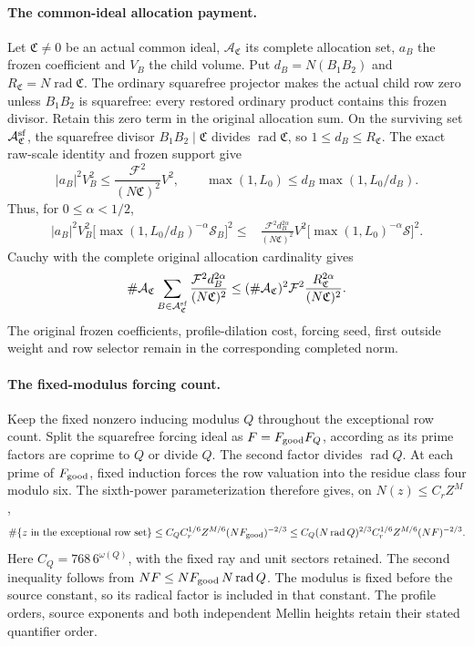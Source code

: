 \paragraph{The common-ideal allocation payment.}
Let \(\mathfrak C\ne0\) be an actual common ideal,
\(\mathcal A_{\mathfrak C}\) its complete allocation set,
\(a_B\) the frozen coefficient and \(V_B\) the child volume.
Put \(d_B=N(B_1B_2)\) and
\(R_{\mathfrak C}=N\operatorname{rad}\mathfrak C\).
The ordinary squarefree projector makes the actual child row zero
unless \(B_1B_2\) is squarefree: every restored ordinary product
contains this frozen divisor. Retain this zero term in the original
allocation sum. On the surviving set \(\mathcal A_{\mathfrak C}^{\rm sf}\),
the squarefree divisor \(B_1B_2\mid\mathfrak C\) divides
\(\operatorname{rad}\mathfrak C\), so \(1\le d_B\le R_{\mathfrak C}\).
The exact raw-scale identity and frozen support give
\[
 |a_B|^2V_B^2\le\frac{\mathcal F^2}{(N\mathfrak C)^2}V^2,
 \qquad \max(1,L_0)\le d_B\max(1,L_0/d_B).
\]
Thus, for \(0\le\alpha<1/2\),
\[
\begin{split}
 |a_B|^2V_B^2
 \bigl[\max(1,L_0/d_B)^{-\alpha}\mathcal S_B\bigr]^2
 \le{}&\frac{\mathcal F^2d_B^{2\alpha}}{(N\mathfrak C)^2}
 V^2\bigl[\max(1,L_0)^{-\alpha}\mathcal S\bigr]^2.
\end{split}
\]
Cauchy with the complete original allocation cardinality gives
\[
 \#\mathcal A_{\mathfrak C}
 \sum_{B\in\mathcal A_{\mathfrak C}^{\rm sf}}
 \frac{\mathcal F^2d_B^{2\alpha}}{(N\mathfrak C)^2}
 \le (\#\mathcal A_{\mathfrak C})^2\mathcal F^2
       \frac{R_{\mathfrak C}^{2\alpha}}{(N\mathfrak C)^2}.
\]
The original frozen coefficients, profile-dilation cost, forcing seed,
first outside weight and row selector remain in the corresponding
completed norm.

\paragraph{The fixed-modulus forcing count.}
Keep the fixed nonzero inducing modulus \(Q\) throughout the exceptional
row count. Split the squarefree forcing ideal as
\(F=F_{\rm good}F_Q\), according as its prime factors are coprime to
\(Q\) or divide \(Q\). The second factor divides
\(\operatorname{rad}Q\). At each prime of \(F_{\rm good}\), fixed
induction forces the row valuation into the residue class four modulo
six. The sixth-power parameterization therefore gives, on
\(N(z)\le C_rZ^M\),
\[
 \#\{z\text{ in the exceptional row set}\}
 \le C_Q C_r^{1/6}Z^{M/6}(NF_{\rm good})^{-2/3}
 \le C_Q(N\operatorname{rad}Q)^{2/3}
       C_r^{1/6}Z^{M/6}(NF)^{-2/3}.
\]
Here \(C_Q=768\,6^{\omega(Q)}\), with the fixed ray and unit
sectors retained. The second inequality follows from
\(NF\le NF_{\rm good}\,N\operatorname{rad}Q\). The modulus is fixed
before the source constant, so its radical factor is included in that
constant. The profile orders, source exponents and both independent
Mellin heights retain their stated quantifier order.

